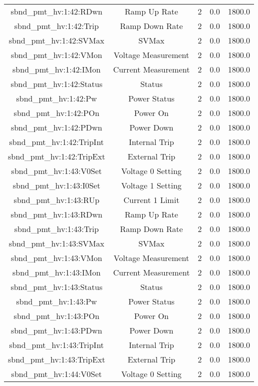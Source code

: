 \begin{table}[ptb]
\begin{tabular}{c | c c c c}
sbnd_pmt_hv:1:42:RDwn & Ramp Up Rate & 2 & 0.0 & 1800.0\\ 
sbnd_pmt_hv:1:42:Trip & Ramp Down Rate & 2 & 0.0 & 1800.0\\ 
sbnd_pmt_hv:1:42:SVMax & SVMax & 2 & 0.0 & 1800.0\\ 
sbnd_pmt_hv:1:42:VMon & Voltage Measurement & 2 & 0.0 & 1800.0\\ 
sbnd_pmt_hv:1:42:IMon & Current Measurement & 2 & 0.0 & 1800.0\\ 
sbnd_pmt_hv:1:42:Status & Status & 2 & 0.0 & 1800.0\\ 
sbnd_pmt_hv:1:42:Pw & Power Status & 2 & 0.0 & 1800.0\\ 
sbnd_pmt_hv:1:42:POn & Power On & 2 & 0.0 & 1800.0\\ 
sbnd_pmt_hv:1:42:PDwn & Power Down & 2 & 0.0 & 1800.0\\ 
sbnd_pmt_hv:1:42:TripInt & Internal Trip & 2 & 0.0 & 1800.0\\ 
sbnd_pmt_hv:1:42:TripExt & External Trip & 2 & 0.0 & 1800.0\\ 
sbnd_pmt_hv:1:43:V0Set & Voltage 0 Setting & 2 & 0.0 & 1800.0\\ 
sbnd_pmt_hv:1:43:I0Set & Voltage 1 Setting & 2 & 0.0 & 1800.0\\ 
sbnd_pmt_hv:1:43:RUp & Current 1 Limit & 2 & 0.0 & 1800.0\\ 
sbnd_pmt_hv:1:43:RDwn & Ramp Up Rate & 2 & 0.0 & 1800.0\\ 
sbnd_pmt_hv:1:43:Trip & Ramp Down Rate & 2 & 0.0 & 1800.0\\ 
sbnd_pmt_hv:1:43:SVMax & SVMax & 2 & 0.0 & 1800.0\\ 
sbnd_pmt_hv:1:43:VMon & Voltage Measurement & 2 & 0.0 & 1800.0\\ 
sbnd_pmt_hv:1:43:IMon & Current Measurement & 2 & 0.0 & 1800.0\\ 
sbnd_pmt_hv:1:43:Status & Status & 2 & 0.0 & 1800.0\\ 
sbnd_pmt_hv:1:43:Pw & Power Status & 2 & 0.0 & 1800.0\\ 
sbnd_pmt_hv:1:43:POn & Power On & 2 & 0.0 & 1800.0\\ 
sbnd_pmt_hv:1:43:PDwn & Power Down & 2 & 0.0 & 1800.0\\ 
sbnd_pmt_hv:1:43:TripInt & Internal Trip & 2 & 0.0 & 1800.0\\ 
sbnd_pmt_hv:1:43:TripExt & External Trip & 2 & 0.0 & 1800.0\\ 
sbnd_pmt_hv:1:44:V0Set & Voltage 0 Setting & 2 & 0.0 & 1800.0\\ 

\end{tabular}
\end{table}
